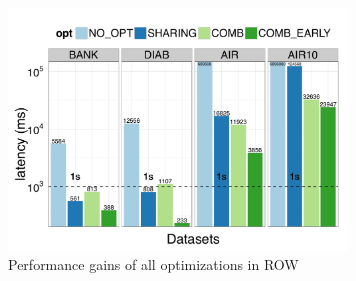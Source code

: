 
\begin{figure}[h]
	\centering
	\includegraphics[width=9cm] {Images/all_opt_real_data_row.pdf}
	\caption{Performance gains of all optimizations in ROW}
	\label{fig:share_prune_row}
	\vspace{-15pt}
\end{figure}
 
